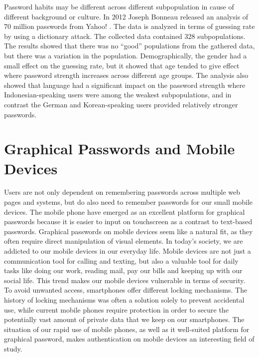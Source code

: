   Password habits may be different across different subpopulation in cause of different background or culture. In 2012 Joseph Bonneau released an analysis of 70 million passwords from Yahoo! \cite{Bonneau2}. The data is analyzed in terms of guessing rate by using a dictionary attack. The collected data contained 328 subpopulations. The results showed that there was no ``good'' populations from the gathered data, but there was a variation in the population. Demographically, the gender had a small effect on the guessing rate, but it showed that age tended to give effect where password strength increases across different age groups. The analysis also showed that language had a significant impact on the password strength where Indonesian-speaking users were among the weakest subpopulations, and in contrast the German and Korean-speaking users provided relatively stronger passwords.

  

  \section{Graphical Passwords and Mobile Devices}
  Users are not only dependent on remembering passwords across multiple web pages and systems, but do also need to remember passwords for our small mobile devices. The mobile phone have emerged as an excellent platform for graphical passwords because it is easier to input on touchscreen as a contrast to text-based passwords. Graphical passwords on mobile devices seem like a natural fit, as they often require direct manipulation of visual elements. In today's society, we are addicted to our mobile devices in our everyday life. Mobile devices are not just a communication tool for calling and texting, but also a valuable tool for daily tasks like doing our work, reading mail, pay our bills and keeping up with our social life. This trend makes our mobile devices vulnerable in terms of security. To avoid unwanted access, smartphones offer different locking mechanisms. The history of locking mechanisms was often a solution solely to prevent accidental use, while current mobile phones require protection in order to secure the potentially vast amount of private data that we keep on our smartphones. The situation of our rapid use of mobile phones, as well as it well-suited platform for graphical password, makes authentication on mobile devices an interesting field of study.

